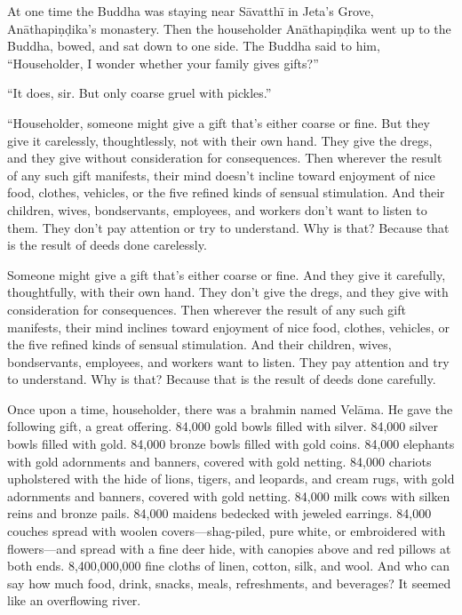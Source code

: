 \documentclass[12pt,openany]{book}%
\begin{document}
At one time the Buddha was staying near \textsanskrit{Sāvatthī} in Jeta’s Grove, \textsanskrit{Anāthapiṇḍika}’s monastery. Then the householder \textsanskrit{Anāthapiṇḍika} went up to the Buddha, bowed, and sat down to one side. The Buddha said to him, “Householder, I wonder whether your family gives gifts?” 

“It does, sir. But only coarse gruel with pickles.” 

“Householder, someone might give a gift that’s either coarse or fine. But they give it carelessly, thoughtlessly, not with their own hand. They give the dregs, and they give without consideration for consequences. Then wherever the result of any such gift manifests, their mind doesn’t incline toward enjoyment of nice food, clothes, vehicles, or the five refined kinds of sensual stimulation. And their children, wives, bondservants, employees, and workers don’t want to listen to them. They don’t pay attention or try to understand. Why is that? Because that is the result of deeds done carelessly. 

Someone might give a gift that’s either coarse or fine. And they give it carefully, thoughtfully, with their own hand. They don’t give the dregs, and they give with consideration for consequences. Then wherever the result of any such gift manifests, their mind inclines toward enjoyment of nice food, clothes, vehicles, or the five refined kinds of sensual stimulation. And their children, wives, bondservants, employees, and workers want to listen. They pay attention and try to understand. Why is that? Because that is the result of deeds done carefully. 

Once upon a time, householder, there was a brahmin named \textsanskrit{Velāma}. He gave the following gift, a great offering. 84,000 gold bowls filled with silver. 84,000 silver bowls filled with gold. 84,000 bronze bowls filled with gold coins. 84,000 elephants with gold adornments and banners, covered with gold netting. 84,000 chariots upholstered with the hide of lions, tigers, and leopards, and cream rugs, with gold adornments and banners, covered with gold netting. 84,000 milk cows with silken reins and bronze pails. 84,000 maidens bedecked with jeweled earrings. 84,000 couches spread with woolen covers—shag-piled, pure white, or embroidered with flowers—and spread with a fine deer hide, with canopies above and red pillows at both ends. 8,400,000,000 fine cloths of linen, cotton, silk, and wool. And who can say how much food, drink, snacks, meals, refreshments, and beverages? It seemed like an overflowing river. 
\end{document}
